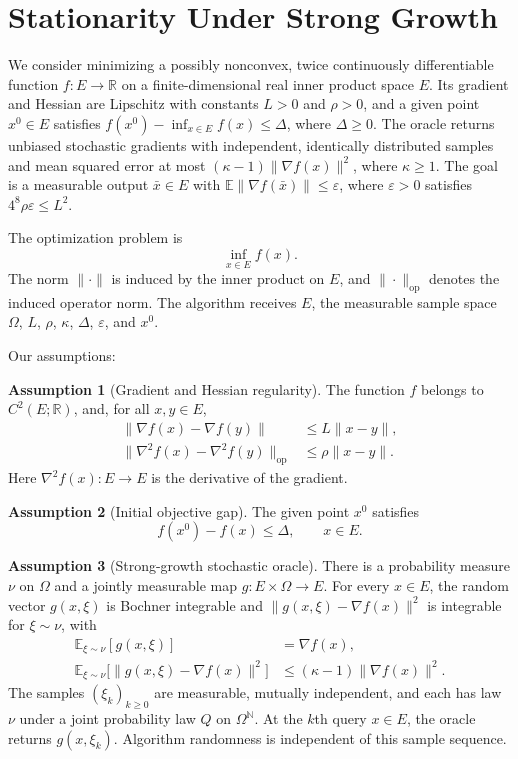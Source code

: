 \documentclass[10pt]{article}
\theoremstyle{definition}
\newtheorem{assumption}{Assumption}
\begin{document}
\section*{Stationarity Under Strong Growth}
We consider minimizing a possibly nonconvex, twice continuously differentiable function $f:E\to\mathbb{R}$ on a finite-dimensional real inner product space $E$. Its gradient and Hessian are Lipschitz with constants $L>0$ and $\rho>0$, and a given point $x^0\in E$ satisfies $f(x^0)-\inf_{x\in E}f(x)\leq\Delta$, where $\Delta\geq0$. The oracle returns unbiased stochastic gradients with independent, identically distributed samples and mean squared error at most $(\kappa-1)\|\nabla f(x)\|^2$, where $\kappa\geq1$. The goal is a measurable output $\bar{x}\in E$ with $\mathbb{E}\|\nabla f(\bar{x})\|\leq\varepsilon$, where $\varepsilon>0$ satisfies $4^8\rho\varepsilon\leq L^2$.

The optimization problem is
\[
\inf_{x\in E} f(x).
\]
The norm $\|\cdot\|$ is induced by the inner product on $E$, and $\|\cdot\|_{\mathrm{op}}$ denotes the induced operator norm. The algorithm receives $E$, the measurable sample space $\Omega$, $L$, $\rho$, $\kappa$, $\Delta$, $\varepsilon$, and $x^0$.

Our assumptions:
\begin{assumption}[Gradient and Hessian regularity]
The function $f$ belongs to $C^2(E;\mathbb{R})$, and, for all $x,y\in E$,
\[
\begin{aligned}
\|\nabla f(x)-\nabla f(y)\|&\leq L\|x-y\|,\\
\|\nabla^2 f(x)-\nabla^2 f(y)\|_{\mathrm{op}}&\leq\rho\|x-y\|.
\end{aligned}
\]
Here $\nabla^2 f(x):E\to E$ is the derivative of the gradient.
\end{assumption}

\begin{assumption}[Initial objective gap]
The given point $x^0$ satisfies
\[
f(x^0)-f(x)\leq\Delta,\qquad x\in E.
\]
\end{assumption}

\begin{assumption}[Strong-growth stochastic oracle]
There is a probability measure $\nu$ on $\Omega$ and a jointly measurable map $g:E\times\Omega\to E$. For every $x\in E$, the random vector $g(x,\xi)$ is Bochner integrable and $\|g(x,\xi)-\nabla f(x)\|^2$ is integrable for $\xi\sim\nu$, with
\[
\begin{aligned}
\mathbb{E}_{\xi\sim\nu}[g(x,\xi)]&=\nabla f(x),\\
\mathbb{E}_{\xi\sim\nu}\bigl[\|g(x,\xi)-\nabla f(x)\|^2\bigr]
&\leq(\kappa-1)\|\nabla f(x)\|^2.
\end{aligned}
\]
The samples $(\xi_k)_{k\geq0}$ are measurable, mutually independent, and each has law $\nu$ under a joint probability law $Q$ on $\Omega^{\mathbb{N}}$. At the $k$th query $x\in E$, the oracle returns $g(x,\xi_k)$. Algorithm randomness is independent of this sample sequence.
\end{assumption}
\end{document}
